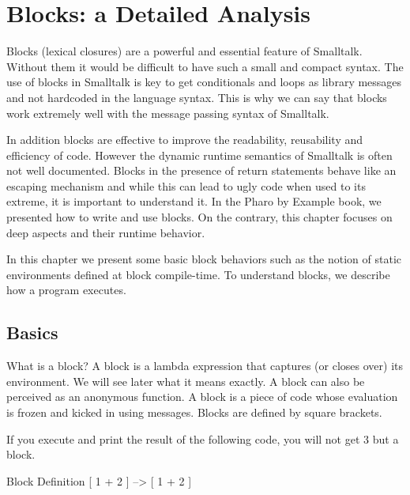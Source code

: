 \documentclass[a4paper,10pt,twoside]{book}
\begin{document}
\fi
\sloppy
\chapter{Blocks: a Detailed Analysis}


Blocks (lexical closures) are a powerful and essential feature of Smalltalk. Without them it
would be difficult to have such a small and compact syntax. The use of blocks in Smalltalk
is key to get conditionals and loops as library messages and not hardcoded in the language syntax. This is why we can say that
blocks work extremely well with the message passing syntax of Smalltalk.

In addition blocks are  effective to improve the readability, reusability and efficiency of code.
However the dynamic runtime semantics of Smalltalk is often not well documented. Blocks in the presence of return statements behave like an escaping mechanism and while this can lead to ugly code when used to its extreme, it is important to understand it. In the Pharo by Example book, we presented how to write and use blocks. On the contrary, this chapter focuses on deep aspects and their runtime behavior.

In this chapter we present some basic block behaviors such as the notion of static environments defined at block compile-time. To understand blocks, we describe how  a program executes.

\section{Basics}

What is a block? A block is a lambda expression that captures (or closes over) its environment. We will see later what it means exactly. A block can also be perceived as an anonymous function. A block is a piece of code whose evaluation is frozen and kicked in using messages. Blocks are defined by square brackets.

If you execute and print the result of the following code, you will not get 3 but a block.

\begin{code}{Block Definition}
[ 1 + 2 ] --> [ 1 + 2 ]
\end{code}
\end{document}
